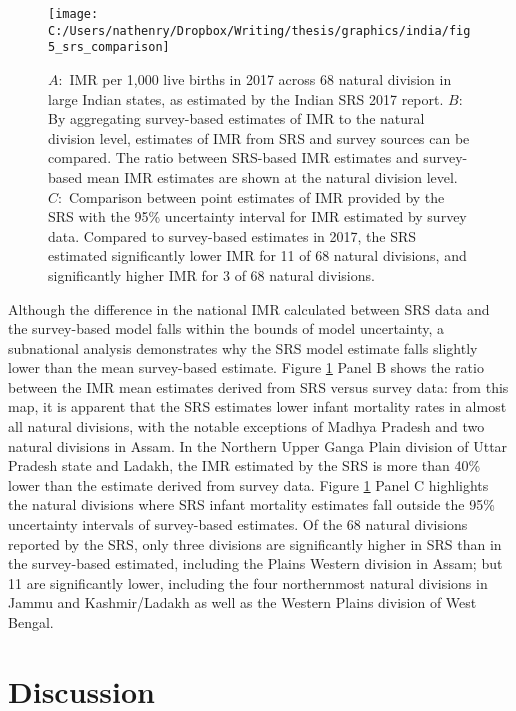 \documentclass[
]{article}
\begin{document}
\begin{figure}[!hbt]

{\centering \texttt{[image: C:/Users/nathenry/Dropbox/Writing/thesis/graphics/india/fig5\_srs\_comparison]} 

}

\caption{\(A:\) IMR per 1,000 live births in 2017 across 68 natural division in large Indian states, as estimated by the Indian SRS 2017 report. \(B:\) By aggregating survey-based estimates of IMR to the natural division level, estimates of IMR from SRS and survey sources can be compared. The ratio between SRS-based IMR estimates and survey-based mean IMR estimates are shown at the natural division level. \(C:\) Comparison between point estimates of IMR provided by the SRS with the 95\% uncertainty interval for IMR estimated by survey data. Compared to survey-based estimates in 2017, the SRS estimated significantly lower IMR for 11 of 68 natural divisions, and significantly higher IMR for 3 of 68 natural divisions.}\label{fig:srs-comparison}
\end{figure}

Although the difference in the national IMR calculated between SRS data and the survey-based model falls within the bounds of model uncertainty, a subnational analysis demonstrates why the SRS model estimate falls slightly lower than the mean survey-based estimate. Figure \ref{fig:srs-comparison} Panel B shows the ratio between the IMR mean estimates derived from SRS versus survey data: from this map, it is apparent that the SRS estimates lower infant mortality rates in almost all natural divisions, with the notable exceptions of Madhya Pradesh and two natural divisions in Assam. In the Northern Upper Ganga Plain division of Uttar Pradesh state and Ladakh, the IMR estimated by the SRS is more than 40\% lower than the estimate derived from survey data. Figure \ref{fig:srs-comparison} Panel C highlights the natural divisions where SRS infant mortality estimates fall outside the 95\% uncertainty intervals of survey-based estimates. Of the 68 natural divisions reported by the SRS, only three divisions are significantly higher in SRS than in the survey-based estimated, including the Plains Western division in Assam; but 11 are significantly lower, including the four northernmost natural divisions in Jammu and Kashmir/Ladakh as well as the Western Plains division of West Bengal.

\hypertarget{discussion}{%
\section{Discussion}\label{discussion}}
\end{document}
